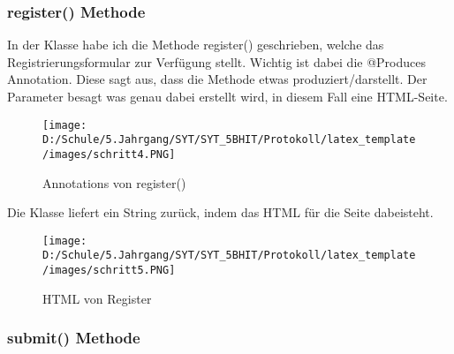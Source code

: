 \subsubsection{register() Methode}
In der Klasse habe ich die Methode register() geschrieben, welche das Registrierungsformular zur Verfügung stellt. Wichtig ist dabei die @Produces Annotation. Diese sagt aus, dass die Methode etwas produziert/darstellt. Der Parameter besagt was genau dabei erstellt wird, in diesem Fall eine HTML-Seite.
 \begin{figure}[htbp] 
  \centering
     \texttt{[image: D:/Schule/5.Jahrgang/SYT/SYT\_5BHIT/Protokoll/latex\_template/images/schritt4.PNG]}
  \caption{Annotations von register()}
  \label{fig:Bild1}
\end{figure}
Die Klasse liefert ein String zurück, indem das HTML für die Seite dabeisteht.
\begin{figure}[htbp] 
  \centering
     \texttt{[image: D:/Schule/5.Jahrgang/SYT/SYT\_5BHIT/Protokoll/latex\_template/images/schritt5.PNG]}
  \caption{HTML von Register}
  \label{fig:Bild1}
\end{figure}

\subsubsection{submit() Methode}
